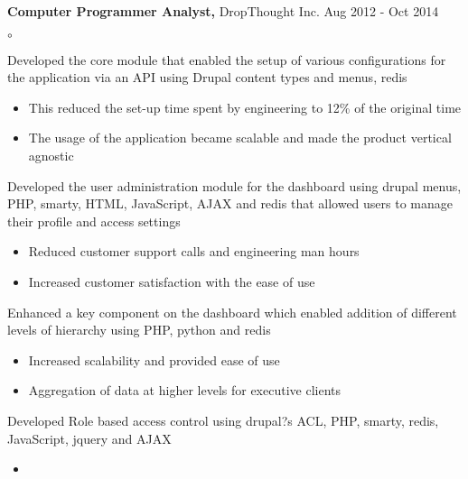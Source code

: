      
\textbf{Computer Programmer Analyst,} DropThought Inc. \hfill Aug 2012 - Oct 2014 \\  
   \begin{list} {$\circ$}{} %
 \item Developed the core module that enabled the setup of various configurations for the application via an API using Drupal content types and menus, redis\itemsep -2pt
   \begin{itemize}[label=]
     \item  \itemsep -8pt%
   This reduced the set-up time spent by engineering to 12\% of the original time\\
     \item  \itemsep -8pt%
   The usage of the application became scalable and made the product vertical agnostic\\
  \end{itemize}       
\item Developed the user administration module for the dashboard using drupal menus, PHP, smarty, HTML, JavaScript, AJAX and redis that allowed users to manage their profile and access settings\itemsep -2pt
   \begin{itemize}[label=]
     \item \itemsep -8pt%
     Reduced customer support calls and engineering man hours \\
     \item  \itemsep -8pt%
    Increased customer satisfaction with the ease of use\\
    \end{itemize}
\item Enhanced a key component on the dashboard which enabled addition of different levels of hierarchy using PHP, python and redis\itemsep -2pt
   \begin{itemize}[label=]
     \item \itemsep -8pt%
     Increased scalability and provided ease of use \\
     \item \itemsep -8pt%
     Aggregation of data at higher levels for executive clients\\
    \end{itemize}     
    \item Developed Role based access control using drupal?s ACL, PHP, smarty, redis, JavaScript, jquery and AJAX\itemsep -2pt
   \begin{itemize}[label=]
     \item  \itemsep -8pt%

\end{itemize}
\end{list}
